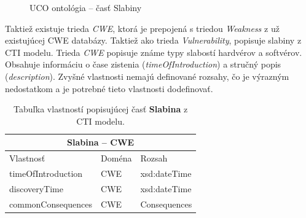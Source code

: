 \documentclass[12pt, a4paper, oneside]{book}
\begin{document}
\begin{figure}[!hb]
\label{fig:ucoSlabiny}
\caption{UCO ontológia -- časť Slabiny}
\end{figure}

Taktiež existuje trieda \textit{CWE}, ktorá je prepojená s triedou \textit{Weakness} z už existujúcej CWE databázy. Taktiež ako trieda \textit{Vulnerability}, popisuje slabiny z CTI modelu. Trieda \textit{CWE} popisuje známe typy slabostí hardvérov a softvérov. Obsahuje informáciu o čase zistenia (\textit{timeOfIntroduction}) a stručný popis (\textit{description}). Zvyšné vlastnosti nemajú definované rozsahy, čo je výrazným nedostatkom a je potrebné tieto vlastnosti dodefinovať.
\begin{table}[hbt!]
\centering
\begin{tabular}{ |p{5cm}||p{3cm}|p{3cm}|  }
 \hline
 \multicolumn{3}{|c|}{Slabina -- CWE} \\
 \hline
 Vlastnosť & Doména & Rozsah\\
 \hline
 timeOfIntroduction & CWE & xsd:dateTime\\
 discoveryTime & CWE & xsd:dateTime\\
 commonConsequences & CWE & Consequences\\
 \hline
\end{tabular}
\caption{Tabuľka vlastností popisujúcej časť \textbf{Slabina} z CTI modelu.}
\label{tab:template}
\end{table}
\end{document}
